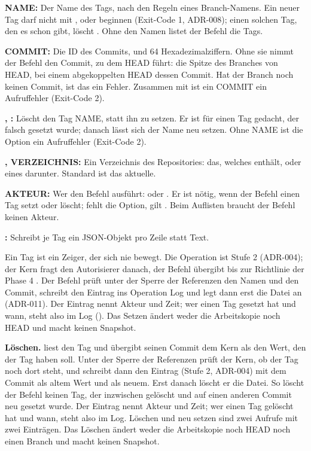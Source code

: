 \startitemize
\item {\bf NAME:} Der Name des Tags, nach den Regeln eines Branch-Namens. Ein neuer Tag darf nicht
mit ,  oder  beginnen (Exit-Code 1, ADR-008);
einen solchen Tag, den es
schon gibt, löscht . Ohne den Namen listet der Befehl die Tags.
\item {\bf COMMIT:} Die ID des Commits,  und 64 Hexadezimalziffern. Ohne sie nimmt der
Befehl den Commit, zu dem HEAD führt: die Spitze des Branches von HEAD, bei einem abgekoppelten
HEAD dessen Commit. Hat der Branch noch keinen Commit, ist das ein Fehler. Zusammen mit
 ist ein COMMIT ein Aufruffehler (Exit-Code 2).
\item {\bf {}, :} Löscht den Tag NAME, statt ihn zu setzen. Er ist für einen
Tag gedacht, der falsch gesetzt wurde; danach lässt sich der Name neu setzen. Ohne NAME ist die
Option ein Aufruffehler (Exit-Code 2).
\item {\bf {},  VERZEICHNIS:} Ein Verzeichnis des Repositories:
das, welches  enthält, oder eines darunter. Standard ist das aktuelle.
\item {\bf {} AKTEUR:} Wer den Befehl ausführt:  oder
. Er ist nötig, wenn der Befehl
einen Tag setzt oder löscht; fehlt die Option, gilt . Beim Auflisten braucht
der Befehl keinen Akteur.
\item {\bf {}:} Schreibt je Tag ein JSON-Objekt pro Zeile statt Text.
\stopitemize

Ein Tag ist ein Zeiger, der sich nie bewegt. Die Operation  ist Stufe 2 (ADR-004);
der Kern fragt den Autorisierer danach, der Befehl übergibt bis zur Richtlinie der Phase 4
. Der Befehl prüft unter der Sperre der Referenzen den Namen und den Commit,
schreibt den Eintrag  ins Operation Log und legt dann erst die Datei
 an (ADR-011). Der Eintrag nennt Akteur und Zeit; wer einen Tag gesetzt hat
und wann, steht also im Log (). Das Setzen ändert weder die Arbeitskopie noch
HEAD und macht keinen Snapshot.

{\bf Löschen.}  liest den Tag und übergibt seinen Commit dem Kern als den Wert,
den der Tag haben soll. Unter der Sperre der Referenzen prüft der Kern, ob der Tag noch dort
steht, und schreibt dann den Eintrag  (Stufe 2, ADR-004) mit dem Commit als altem
Wert und \type{-} als neuem. Erst danach löscht er die Datei. So löscht der Befehl keinen Tag,
der inzwischen gelöscht und auf einen anderen Commit neu gesetzt wurde. Der Eintrag nennt
Akteur und Zeit; wer einen Tag gelöscht hat und wann, steht also im Log. Löschen und neu setzen
sind zwei Aufrufe mit zwei Einträgen. Das Löschen ändert weder die Arbeitskopie noch HEAD noch
einen Branch und macht keinen Snapshot.

